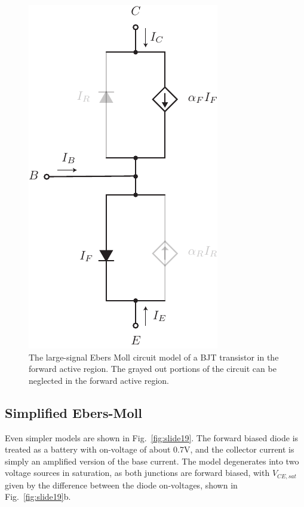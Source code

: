 \begin{figure}[tb]
\begin{center}
\includegraphics[scale=.7]{slide18_ebers_moll_approx}
\end{center}
\caption{The large-signal Ebers Moll circuit model of a BJT transistor in the forward active region.  The grayed out portions of the circuit can be neglected in the forward active region.} \label{fig:slide18_ebers_moll_approx}
\end{figure}


 





\subsection{Simplified Ebers-Moll}

Even simpler models are shown in Fig.~\ref{fig:slide19}. The forward biased diode is treated as a battery with on-voltage of about 0.7V, and the collector current is simply an amplified version of the base current.  The model degenerates into two voltage sources in saturation, as both junctions are forward biased, with $V_{CE,sat}$ given by the difference between the diode on-voltages, shown in Fig.~\ref{fig:slide19}b.


